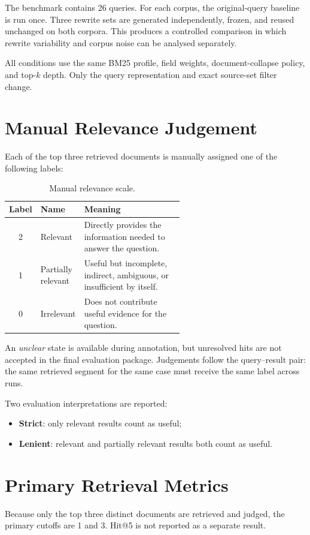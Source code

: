The benchmark contains 26 queries. For each corpus, the original-query baseline is run once. Three rewrite sets are generated independently, frozen, and reused unchanged on both corpora. This produces a controlled comparison in which rewrite variability and corpus noise can be analysed separately.

All conditions use the same BM25 profile, field weights, document-collapse policy, and top-$k$ depth. Only the query representation and exact source-set filter change.

\section{Manual Relevance Judgement}
Each of the top three retrieved documents is manually assigned one of the following labels:

\begin{table}[h]
\centering
\begin{tabular}{clp{0.58\linewidth}}
\toprule
\textbf{Label} & \textbf{Name} & \textbf{Meaning} \\
\midrule
2 & Relevant & Directly provides the information needed to answer the question. \\
1 & Partially relevant & Useful but incomplete, indirect, ambiguous, or insufficient by itself. \\
0 & Irrelevant & Does not contribute useful evidence for the question. \\
\bottomrule
\end{tabular}
\caption{Manual relevance scale.}
\label{tab:relevance-scale}
\end{table}

An \emph{unclear} state is available during annotation, but unresolved hits are not accepted in the final evaluation package. Judgements follow the query--result pair: the same retrieved segment for the same case must receive the same label across runs.

Two evaluation interpretations are reported:

\begin{itemize}
    \item \textbf{Strict}: only relevant results count as useful;
    \item \textbf{Lenient}: relevant and partially relevant results both count as useful.
\end{itemize}

\section{Primary Retrieval Metrics}
Because only the top three distinct documents are retrieved and judged, the primary cutoffs are 1 and 3. Hit@5 is not reported as a separate result.

